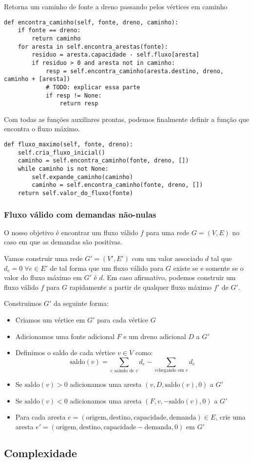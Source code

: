\documentclass[11pt]{article}
\begin{document}
Retorna um caminho de fonte a dreno passando pelos vértices
em caminho
\begin{verbatim}
def encontra_caminho(self, fonte, dreno, caminho):
    if fonte == dreno:
        return caminho
    for aresta in self.encontra_arestas(fonte):
        residuo = aresta.capacidade - self.fluxo[aresta]
        if residuo > 0 and aresta not in caminho:
            resp = self.encontra_caminho(aresta.destino, dreno, caminho + [aresta])
            # TODO: explicar essa parte
            if resp != None:
                return resp
\end{verbatim}

Com todas as funções auxiliares prontas, podemos finalmente definir a
função que encontra o fluxo máximo.
\begin{verbatim}
def fluxo_maximo(self, fonte, dreno):
    self.cria_fluxo_inicial()
    caminho = self.encontra_caminho(fonte, dreno, [])
    while caminho is not None:
        self.expande_caminho(caminho)
        caminho = self.encontra_caminho(fonte, dreno, [])
    return self.valor_do_fluxo(fonte)
\end{verbatim}

\subsubsection{Fluxo válido com demandas não-nulas}
\label{sec-3-3-2}

O nosso objetivo é encontrar um fluxo válido $f$ para uma rede $G =
(V, E)$ no caso em que as demandas são positivas.

Vamos construir uma rede $G' = (V', E')$ com um valor associado $d$
tal que $d_e = 0 \; \forall e \in E'$ de tal forma que um fluxo válido
para $G$ existe se e somente se o valor do fluxo máximo em $G'$ é
$d$. Em caso afirmativo, podemos construir um fluxo válido $f$ para
$G$ rapidamente a partir de qualquer fluxo máximo $f'$ de $G'$.

Construimos $G'$ da seguinte forma:

\begin{itemize}
\item Criamos um vértice em $G'$ para cada vértice $G$
\item Adicionamos uma fonte adicional $F$ e um dreno adicional $D$ a $G'$
\item Definimos o saldo de cada vértice $v \in V$ como: \[
  \textrm{saldo}(v) = \sum_{e \text{ saindo de }v}d_e - \sum_{e \text{
  chegando em }v}d_e \]
\item Se $\mathrm{saldo}(v) > 0$ adicionamos uma aresta $(v, D,
  \mathrm{saldo}(v), 0)$ a $G'$
\item Se $\mathrm{saldo}(v) < 0$ adicionamos uma aresta $(F, v,
  -\mathrm{saldo}(v), 0)$ a $G'$
\item Para cada aresta $e = (\mathrm{origem, destino, capacidade, demanda}) \in E$,
crie uma aresta $e' = (\mathrm{origem, destino, capacidade - demanda, 0})$ em $G'$
\end{itemize}

\subsection{Complexidade}
\label{sec-3-4}
\end{document}

